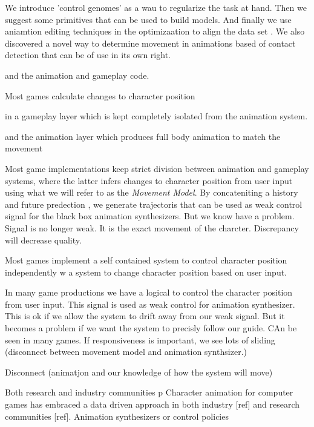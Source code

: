 We introduce 'control genomes' as a wau to regularize the task at hand. Then we suggest some primitives that can be used to build models. And finally we use aniamtion editing techniques in the optimizaation to align the data set . We also discovered a novel way to determine movement in animations based of contact detection that can be of use in its own right.



and   the animation and gameplay code.

Most games calculate changes to character position 

in a gameplay layer which is kept completely isolated from the animation system. 


and the animation layer which produces full body animation to match the movement  





Most game implementations keep strict division between animation and gameplay systems, where the latter infers changes to character position from user input using what we will refer to as the \textit{Movement Model}. By concateniting a history and future predection , we generate trajectoris that can be used as weak control signal for the black box animation synthesizers. But we know have a problem. Signal is no longer weak. It is the exact movement of the charcter. Discrepancy will decrease quality. 

Most games implement a self contained system to control character position independently 
w a system to change character position based on user input. 

In many game productions we have a logical to control the character position from user input. This signal is used as weak control for animation synthesizer. This is ok if we allow the system to drift away from our weak signal. But it becomes a problem if we want the system to precisly follow our guide. CAn be seen in many games. If responsiveness is important, we see lots of sliding (disconnect between movement model and animation synthsizer.)


Disconnect (animatjon and our knowledge of how the system will move)






Both research and industry communities p
Character animation for computer games has embraced a data driven approach in both industry [ref] and research communities [ref]. Animation synthesizers or control policies  




